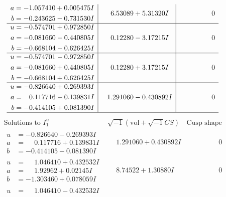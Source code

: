 \documentclass[1p]{elsarticle_modified}
\theoremstyle{definition}
\newcommand{\I}{\sqrt{-1}}
\begin{document}
$$\begin{array}{c|c|c}
\begin{aligned}
a &= -1.057410 + 0.005475 I \\
b &= -0.243625 - 0.731530 I\end{aligned}
 & \phantom{-}6.53089 + 5.31320 I & \phantom{-0.000000 } 0 \\ \hline\begin{aligned}
u &= -0.574701 + 0.972850 I \\
a &= -0.081660 - 0.440805 I \\
b &= -0.668104 - 0.626425 I\end{aligned}
 & \phantom{-}0.12280 - 3.17215 I & \phantom{-0.000000 } 0 \\ \hline\begin{aligned}
u &= -0.574701 - 0.972850 I \\
a &= -0.081660 + 0.440805 I \\
b &= -0.668104 + 0.626425 I\end{aligned}
 & \phantom{-}0.12280 + 3.17215 I & \phantom{-0.000000 } 0 \\ \hline\begin{aligned}
u &= -0.826640 + 0.269393 I \\
a &= \phantom{-}0.117716 - 0.139831 I \\
b &= -0.414105 + 0.081390 I\end{aligned}
 & \phantom{-}1.291060 - 0.430892 I & \phantom{-0.000000 } 0\\
 \hline 
 \end{array}$$\newpage$$\begin{array}{c|c|c}  
\text{Solutions to }I^u_{1}& \I (\text{vol} + \sqrt{-1}CS) & \text{Cusp shape}\\
 \hline 
\begin{aligned}
u &= -0.826640 - 0.269393 I \\
a &= \phantom{-}0.117716 + 0.139831 I \\
b &= -0.414105 - 0.081390 I\end{aligned}
 & \phantom{-}1.291060 + 0.430892 I & \phantom{-0.000000 } 0 \\ \hline\begin{aligned}
u &= \phantom{-}1.046410 + 0.432532 I \\
a &= \phantom{-}1.92962 + 0.02145 I \\
b &= -1.303460 + 0.078059 I\end{aligned}
 & \phantom{-}8.74522 + 1.30880 I & \phantom{-0.000000 } 0 \\ \hline\begin{aligned}
u &= \phantom{-}1.046410 - 0.432532 I \\

\end{aligned}
\end{array}$$
\end{document}
